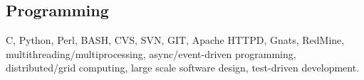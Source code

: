 \documentclass[margin,line]{resume}
\begin{document}
\begin{resume}
    \section{\mysidestyle Programming} 

    C, Python, Perl, BASH, CVS, SVN, GIT, Apache HTTPD, Gnats,
    RedMine, multithreading/multiprocessing, async/event-driven
    programming, distributed/grid computing, large scale software
    design, test-driven development.


\end{resume}
\end{document}
